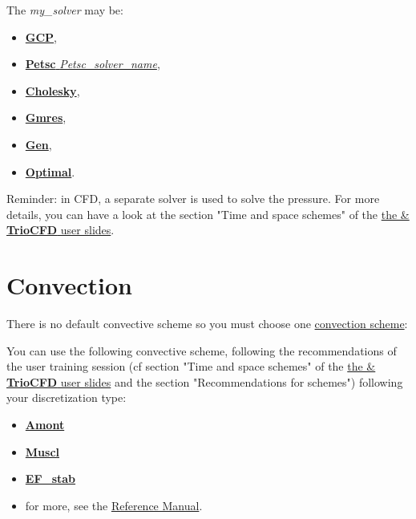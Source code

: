 The \textit{my\_solver} may be:

\begin{itemize}
\item \href{\REFERENCEMANUAL\#solvgcp}{\textbf{GCP}},
\item \href{\REFERENCEMANUAL\#petsc}{\textbf{Petsc} \textit{Petsc\_solver\_name}},
\item \href{\REFERENCEMANUAL\#cholesky}{\textbf{Cholesky}},
\item \href{\REFERENCEMANUAL\#gmres}{\textbf{Gmres}},
\item \href{\REFERENCEMANUAL\#gen}{\textbf{Gen}},
\item \href{\REFERENCEMANUAL\#optimal}{\textbf{Optimal}}.
\end{itemize}

Reminder: in CFD, a separate solver is used to solve the pressure. For more details, you can have a look at the section "Time and space schemes" of the \href{TRUST_and_TrioCFD_presentation.pdf}{the \trust \& \textbf{TrioCFD} user slides}.



\section{Convection}
There is no default convective scheme so you must choose one \href{\REFERENCEMANUAL\#blocconvection}{convection scheme}:
    \begin{center}
    \end{center}

You can use the following convective scheme, following the recommendations of the user training session (cf section "Time and space schemes" of the \href{TRUST_and_TrioCFD_presentation.pdf}{the \trust \& \textbf{TrioCFD} user slides} and the section "Recommendations for schemes") following your discretization type:
\begin{itemize}
\item \href{\REFERENCEMANUAL\#convectionamont}{\textbf{Amont}}
\item \href{\REFERENCEMANUAL\#convectionmuscl}{\textbf{Muscl}}
\item \href{\REFERENCEMANUAL\#convectionefstab}{\textbf{EF\_stab}}
\item for more, see the \href{\REFERENCEMANUAL\#blocconvection}{\trustref Reference Manual}.
\end{itemize}

